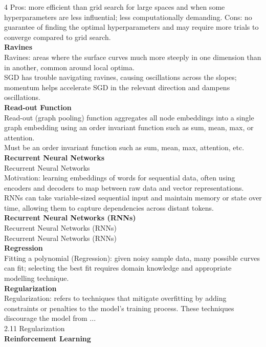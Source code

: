 \documentclass[8pt]{extarticle}
\begin{document}
\begin{multicols}{4}
{Pros: more efficient than grid search for large spaces and when some hyperparameters are less influential; less computationally demanding. Cons: no guarantee of finding the optimal hyperparameters and may require more trials to converge compared to grid search.\\
\vspace{2pt}\textbf{Ravines}\\
Ravines: areas where the surface curves much more steeply in one dimension than in another, common around local optima.\\
SGD has trouble navigating ravines, causing oscillations across the slopes; momentum helps accelerate SGD in the relevant direction and dampens oscillations.\\
\vspace{2pt}\textbf{Read-out Function}\\
Read-out (graph pooling) function aggregates all node embeddings into a single graph embedding using an order invariant function such as sum, mean, max, or attention.\\
Must be an order invariant function such as sum, mean, max, attention, etc.\\
\vspace{2pt}\textbf{Recurrent Neural Networks}\\
Recurrent Neural Networks\\
Motivation: learning embeddings of words for sequential data, often using encoders and decoders to map between raw data and vector representations.\\
RNNs can take variable-sized sequential input and maintain memory or state over time, allowing them to capture dependencies across distant tokens.\\
\vspace{2pt}\textbf{Recurrent Neural Networks (RNNs)}\\
Recurrent Neural Networks (RNNs)\\
Recurrent Neural Networks (RNNs)\\
\vspace{2pt}\textbf{Regression}\\
Fitting a polynomial (Regression): given noisy sample data, many possible curves can fit; selecting the best fit requires domain knowledge and appropriate modelling technique.\\
\vspace{2pt}\textbf{Regularization}\\
Regularization: refers to techniques that mitigate overfitting by adding constraints or penalties to the model's training process. These techniques discourage the model from ...\\
2.11 Regularization\\
\vspace{2pt}\textbf{Reinforcement Learning}\\

}
\end{multicols}
\end{document}

